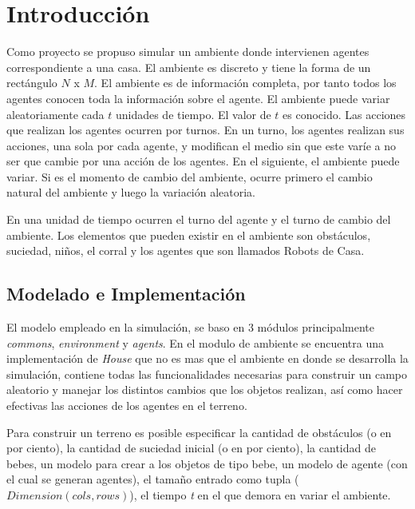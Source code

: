\documentclass[a4paper,10pt,twocolumn]{article}
\begin{document}
\section{Introducción}
  Como proyecto se propuso simular un ambiente donde intervienen agentes correspondiente a una casa. El ambiente es discreto y tiene la forma de un rect\'angulo $N$ x $M$. El ambiente es de informaci\'on completa, por tanto todos los agentes conocen toda la informaci\'on sobre el agente. El ambiente puede variar aleatoriamente cada $t$ unidades de tiempo. El valor de $t$ es conocido. Las acciones que realizan los agentes ocurren por turnos. En un turno, los agentes realizan sus acciones, una sola por cada agente, y modifican el medio sin que este var\'ie a no ser que cambie por una acci\'on de los agentes. En el siguiente, el ambiente puede variar. Si es el momento de cambio del ambiente, ocurre primero el cambio natural del ambiente y luego la variaci\'on aleatoria.
  
  En una unidad de tiempo ocurren el turno del agente y el turno de cambio del ambiente. Los elementos que pueden existir en el ambiente son obst\'aculos, suciedad, ni\~nos, el corral y los agentes que son llamados Robots de Casa.  

\subsection{Modelado e Implementaci\'on}

 El modelo empleado en la simulación, se baso en $3$ m\'odulos principalmente \textit{commons}, \textit{environment} y \textit{agents}. En el modulo de ambiente se encuentra una implementaci\'on de \textit{House} que no es mas que el ambiente en donde se desarrolla la simulaci\'on, contiene todas las funcionalidades necesarias para construir un campo aleatorio y manejar los distintos cambios que los objetos realizan, as\'i como hacer efectivas las acciones de los agentes en el terreno. 
 
 Para construir un terreno es posible especificar la cantidad de obst\'aculos (o en por ciento), la cantidad de suciedad inicial (o en por ciento), la cantidad de bebes, un modelo para crear a los objetos de tipo bebe, un modelo de agente (con el cual se generan agentes), el tama\~no entrado como tupla ($Dimension(cols, rows)$), el tiempo \textit{t} en el que demora en variar el ambiente.
 
\end{document}
